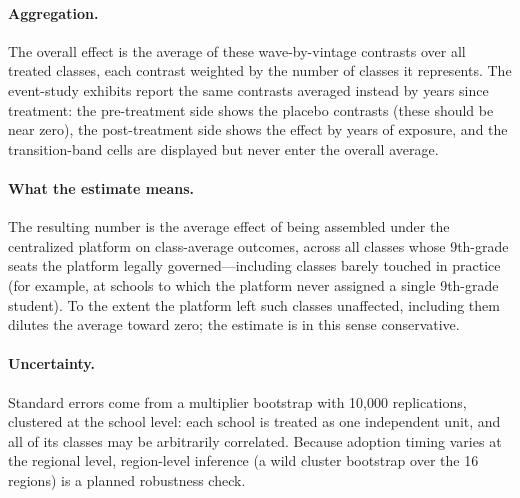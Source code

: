 \paragraph{Aggregation.}
The overall effect is the average of these wave-by-vintage contrasts over all treated classes, each contrast weighted by the number of classes it represents. The event-study exhibits report the same contrasts averaged instead by years since treatment: the pre-treatment side shows the placebo contrasts (these should be near zero), the post-treatment side shows the effect by years of exposure, and the transition-band cells are displayed but never enter the overall average.

\paragraph{What the estimate means.}
The resulting number is the average effect of being assembled under the centralized platform on class-average outcomes, across all classes whose 9th-grade seats the platform legally governed---including classes barely touched in practice (for example, at schools to which the platform never assigned a single 9th-grade student). To the extent the platform left such classes unaffected, including them dilutes the average toward zero; the estimate is in this sense conservative.

\paragraph{Uncertainty.}
Standard errors come from a multiplier bootstrap with 10,000 replications, clustered at the school level: each school is treated as one independent unit, and all of its classes may be arbitrarily correlated. Because adoption timing varies at the regional level, region-level inference (a wild cluster bootstrap over the 16 regions) is a planned robustness check.

